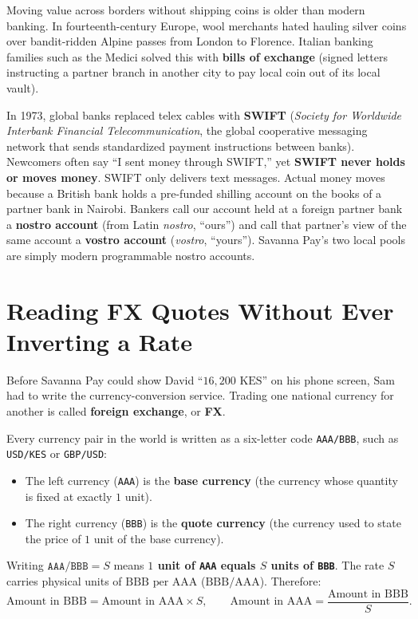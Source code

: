 \begin{historybox}
Moving value across borders without shipping coins is older than modern banking. In fourteenth-century Europe, wool merchants hated hauling silver coins over bandit-ridden Alpine passes from London to Florence. Italian banking families such as the Medici solved this with \textbf{bills of exchange} (signed letters instructing a partner branch in another city to pay local coin out of its local vault).

In 1973, global banks replaced telex cables with \textbf{SWIFT} (\emph{Society for Worldwide Interbank Financial Telecommunication}, the global cooperative messaging network that sends standardized payment instructions between banks). Newcomers often say ``I sent money through SWIFT,'' yet \textbf{SWIFT never holds or moves money}. SWIFT only delivers text messages. Actual money moves because a British bank holds a pre-funded shilling account on the books of a partner bank in Nairobi. Bankers call our account held at a foreign partner bank a \textbf{nostro account} (from Latin \emph{nostro}, ``ours'') and call that partner's view of the same account a \textbf{vostro account} (\emph{vostro}, ``yours''). Savanna Pay's two local pools are simply modern programmable nostro accounts.
\end{historybox}

\section{Reading FX Quotes Without Ever Inverting a Rate}

Before Savanna Pay could show David ``$16{,}200\text{ KES}$'' on his phone screen, Sam had to write the currency-conversion service. Trading one national currency for another is called \textbf{foreign exchange}, or \textbf{FX}.

Every currency pair in the world is written as a six-letter code \texttt{AAA/BBB}, such as \texttt{USD/KES} or \texttt{GBP/USD}:
\begin{itemize}
  \item The left currency (\texttt{AAA}) is the \textbf{base currency} (the currency whose quantity is fixed at exactly $1$ unit).
  \item The right currency (\texttt{BBB}) is the \textbf{quote currency} (the currency used to state the price of $1$ unit of the base currency).
\end{itemize}

\begin{definition}
Writing $\texttt{AAA/BBB} = S$ means \textbf{$1$ unit of \texttt{AAA} equals $S$ units of \texttt{BBB}}. The rate $S$ carries physical units of $\text{BBB per AAA}$ ($\text{BBB}/\text{AAA}$). Therefore:
\[
  \text{Amount in BBB} = \text{Amount in AAA} \times S, \qquad
  \text{Amount in AAA} = \frac{\text{Amount in BBB}}{S}.
\]
\end{definition}

